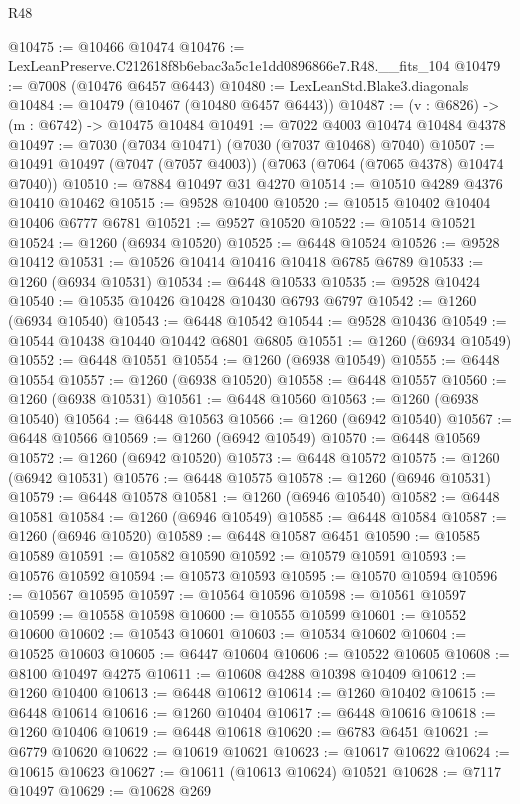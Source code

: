 \begin{lexlean}{R48}
\begin{coremodule}
@10475 := @10466 @10474
@10476 := LexLeanPreserve.C212618f8b6ebac3a5c1e1dd0896866e7.R48.__fits_104
@10479 := @7008 (@10476 @6457 @6443)
@10480 := LexLeanStd.Blake3.diagonals
@10484 := @10479 (@10467 (@10480 @6457 @6443))
@10487 := (v : @6826) -> (m : @6742) -> @10475 @10484
@10491 := @7022 @4003 @10474 @10484 @4378
@10497 := @7030 (@7034 @10471) (@7030 (@7037 @10468) @7040)
@10507 := @10491 @10497 (@7047 (@7057 @4003)) (@7063 (@7064 (@7065 @4378) @10474 @7040))
@10510 := @7884 @10497 @31 @4270
@10514 := @10510 @4289 @4376 @10410 @10462
@10515 := @9528 @10400
@10520 := @10515 @10402 @10404 @10406 @6777 @6781
@10521 := @9527 @10520
@10522 := @10514 @10521
@10524 := @1260 (@6934 @10520)
@10525 := @6448 @10524
@10526 := @9528 @10412
@10531 := @10526 @10414 @10416 @10418 @6785 @6789
@10533 := @1260 (@6934 @10531)
@10534 := @6448 @10533
@10535 := @9528 @10424
@10540 := @10535 @10426 @10428 @10430 @6793 @6797
@10542 := @1260 (@6934 @10540)
@10543 := @6448 @10542
@10544 := @9528 @10436
@10549 := @10544 @10438 @10440 @10442 @6801 @6805
@10551 := @1260 (@6934 @10549)
@10552 := @6448 @10551
@10554 := @1260 (@6938 @10549)
@10555 := @6448 @10554
@10557 := @1260 (@6938 @10520)
@10558 := @6448 @10557
@10560 := @1260 (@6938 @10531)
@10561 := @6448 @10560
@10563 := @1260 (@6938 @10540)
@10564 := @6448 @10563
@10566 := @1260 (@6942 @10540)
@10567 := @6448 @10566
@10569 := @1260 (@6942 @10549)
@10570 := @6448 @10569
@10572 := @1260 (@6942 @10520)
@10573 := @6448 @10572
@10575 := @1260 (@6942 @10531)
@10576 := @6448 @10575
@10578 := @1260 (@6946 @10531)
@10579 := @6448 @10578
@10581 := @1260 (@6946 @10540)
@10582 := @6448 @10581
@10584 := @1260 (@6946 @10549)
@10585 := @6448 @10584
@10587 := @1260 (@6946 @10520)
@10589 := @6448 @10587 @6451
@10590 := @10585 @10589
@10591 := @10582 @10590
@10592 := @10579 @10591
@10593 := @10576 @10592
@10594 := @10573 @10593
@10595 := @10570 @10594
@10596 := @10567 @10595
@10597 := @10564 @10596
@10598 := @10561 @10597
@10599 := @10558 @10598
@10600 := @10555 @10599
@10601 := @10552 @10600
@10602 := @10543 @10601
@10603 := @10534 @10602
@10604 := @10525 @10603
@10605 := @6447 @10604
@10606 := @10522 @10605
@10608 := @8100 @10497 @4275
@10611 := @10608 @4288 @10398 @10409
@10612 := @1260 @10400
@10613 := @6448 @10612
@10614 := @1260 @10402
@10615 := @6448 @10614
@10616 := @1260 @10404
@10617 := @6448 @10616
@10618 := @1260 @10406
@10619 := @6448 @10618
@10620 := @6783 @6451
@10621 := @6779 @10620
@10622 := @10619 @10621
@10623 := @10617 @10622
@10624 := @10615 @10623
@10627 := @10611 (@10613 @10624) @10521
@10628 := @7117 @10497
@10629 := @10628 @269

\end{coremodule}
\end{lexlean}
